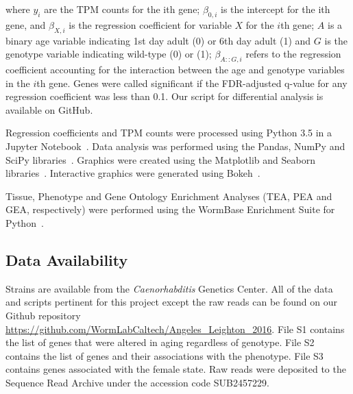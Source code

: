 where $y_i$ are the TPM counts for the ith gene; $\beta_{0,i}$ is the intercept
for the ith gene, and $\beta_{X,i}$ is the regression coefficient for variable
$X$ for the $i$th gene; $A$ is a binary age variable indicating 1st day adult
(0) or 6th day adult (1) and $G$ is the genotype variable indicating wild-type
(0) or \fog{} (1); $\beta_{A::G, i}$ refers to the regression coefficient
accounting for the interaction between the age and genotype variables in the
$i$th gene. Genes were called significant if the FDR-adjusted q-value for any
regression coefficient was less than 0.1. Our script for differential analysis
is available on GitHub.

Regression coefficients and TPM counts were processed using Python 3.5 in a
Jupyter Notebook~\citep{Perez2007}. Data analysis was performed using the Pandas,
NumPy and SciPy libraries~\citep{McKinney2011,VanDerWalt2011,Oliphant2007}.
Graphics were created using the Matplotlib and Seaborn
libraries~\citep{Waskom,Hunter2007}. Interactive graphics were generated using
Bokeh~\citep{Team2014}.

Tissue, Phenotype and Gene Ontology Enrichment
Analyses (TEA, PEA and GEA, respectively) were performed using the WormBase
Enrichment Suite for Python~\citep{Angeles-Albores2016,Angeles-Albores106369}.

\subsection*{Data Availability}
\label{sb:data_availability}
Strains are available from the \emph{Caenorhabditis} Genetics Center. All of the
data and scripts pertinent for this project except the raw reads can be found on
our Github repository
\url{https://github.com/WormLabCaltech/Angeles_Leighton_2016}. File S1
contains the list of genes that were altered in aging regardless of genotype.
File S2 contains the list of genes and their associations with the \fog{}
phenotype. File S3 contains genes associated with the female state. Raw reads
were deposited to the Sequence Read Archive under the accession code SUB2457229.

